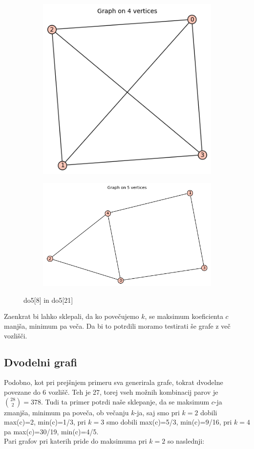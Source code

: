 \documentclass[12pt, a4paper]{article}
\begin{document}
\begin{center}
\begin{figure}[!htb]
\centering
\begin{subfigure}{0.5\textwidth}
  \centering
  \includegraphics[width=0.5\linewidth]{do5[8]}
\end{subfigure}%
\begin{subfigure}{0.5\textwidth}
  \centering
  \includegraphics[width=0.9\linewidth]{do5[21]}
\end{subfigure}
\caption{do5[8] in do5[21]}
\label{fig:test}
\end{figure}
\end{center}
Zaenkrat bi lahko sklepali, da ko povečujemo $k$, se maksimum koeficienta $c$ manjša, minimum pa veča. Da bi to potrdili moramo testirati še grafe z več vozlišči. \\

\subsection{Dvodelni grafi}
Podobno, kot pri prejšnjem primeru sva generirala grafe, tokrat dvodelne povezane do 6 vozlišč. Teh je 27, torej vseh možnih kombinacij parov je $\binom{28}{2}=378$. Tudi ta primer potrdi naše sklepanje, da se maksimum $c$-ja zmanjša, minimum pa poveča, ob večanju $k$-ja, saj smo pri $k=2$ dobili max(c)=2, min(c)=1/3, pri $k=3$ smo dobili max(c)=5/3, min(c)=9/16, pri $k=4$ pa max(c)=30/19, min(c)=4/5. \\
Pari grafov pri katerih pride do maksimuma pri $k=2$ so naslednji:
\end{document}
